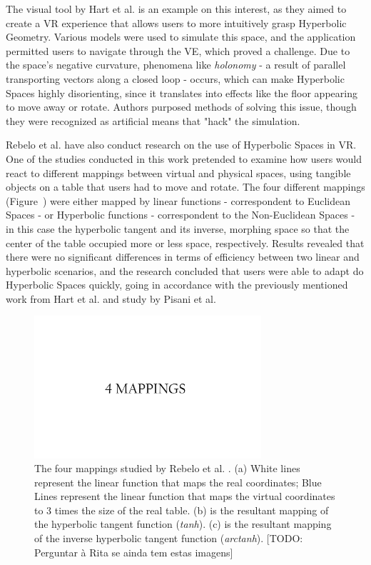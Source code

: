 The visual tool by Hart et al. \cite{Hart2017} is an example on this interest, as they aimed to create a \gls{VR} experience that allows users to 
more intuitively grasp Hyperbolic Geometry. Various models were used to simulate this space, and the application permitted users to navigate through 
the \gls{VE}, which proved a challenge. Due to the space's negative curvature, phenomena like \textit{holonomy} - 
a result of parallel transporting vectors along a closed loop - occurs, which can make Hyperbolic Spaces highly disorienting, 
since it translates into effects like the floor appearing to move away 
or rotate. Authors purposed methods of solving this issue, though they were recognized as artificial means that "hack" the simulation.

Rebelo et al. \cite{Rebelo2022} have also conduct research on the use of Hyperbolic Spaces in \gls{VR}. One of the studies conducted in this work 
pretended to examine how users would react to different mappings between virtual and physical spaces, using tangible objects on a table that users 
had to move and rotate. The four different mappings (Figure~) were either mapped by linear functions - correspondent to Euclidean Spaces - 
or Hyperbolic functions - correspondent to the Non-Euclidean Spaces - in this case the hyperbolic tangent and its inverse, morphing space so that 
the center of the table occupied more or less space, respectively. Results revealed that 
there were no significant differences in terms of efficiency between two linear and hyperbolic scenarios, and the research concluded that users 
were able to adapt do Hyperbolic Spaces quickly, going in accordance with the previously mentioned work from Hart et al. \cite{Hart2017} and 
study by Pisani et al. \cite{Pisani2019}

\begin{figure}[t]
    \centering
     \includegraphics[width=0.75\textwidth]{NOVAthesisFiles/Images/papers/mappings.png}
     \caption{The four mappings studied by Rebelo et al. \cite{Rebelo2022}. (a) White lines represent the linear function that maps the 
     real coordinates; Blue Lines represent the linear function that maps the virtual coordinates to 3 times the size of the real table. 
     (b) is the resultant mapping of the hyperbolic tangent function (\textit{tanh}).
     (c) is the resultant mapping of the inverse hyperbolic tangent function (\textit{arctanh}). 
     [TODO: Perguntar à Rita se ainda tem estas imagens]}
    \label{fig:mappings}
 \end{figure}

